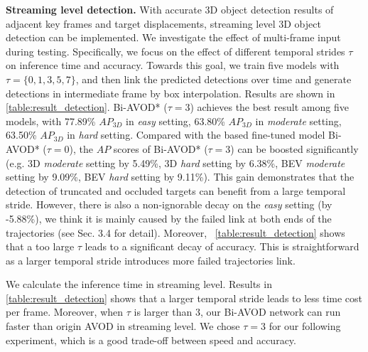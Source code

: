 \documentclass{bmvc2k}
\begin{document}
\textbf{Streaming level detection.} With accurate 3D object detection results of adjacent key frames and target displacements, streaming level 3D object detection can be implemented. We investigate the effect of multi-frame input during testing. Specifically, we focus on the effect of different temporal strides $\tau$  on inference time and accuracy. Towards this goal, we train five models with $\tau = \{0, 1, 3, 5, 7\}$, and then link the predicted detections over time and generate detections in intermediate frame by box interpolation. Results are shown in \tablename \, \ref{table:result_detection}. Bi-AVOD* ($\tau = 3$) achieves the best result among five models, with 77.89\% $AP_{3D}$ in \textit{easy} setting, 63.80\% $AP_{3D}$ in \textit{moderate} setting, 63.50\% $AP_{3D}$ in \textit{hard} setting. Compared with the based fine-tuned model Bi-AVOD* ($\tau = 0$), the $AP$ scores of Bi-AVOD* ($\tau = 3$) can be boosted significantly (e.g. 3D \textit{moderate} setting by 5.49\%, 3D \textit{hard} setting by 6.38\%, BEV \textit{moderate} setting by 9.09\%, BEV \textit{hard} setting by 9.11\%). This gain demonstrates that the detection of truncated and occluded targets can benefit from a large temporal stride. However, there is also a non-ignorable decay on the \textit{easy} setting (by -5.88\%), we think it is mainly caused by the failed link at both ends of the trajectories (see Sec. 3.4 for detail). Moreover,  \tablename \, \ref{table:result_detection} shows that a too large $\tau$ leads to a significant decay of accuracy. This is straightforward as a larger temporal stride introduces more failed trajectories link.

We calculate the inference time in streaming level. Results in  \tablename \, \ref{table:result_detection} shows that a larger temporal stride leads to less time cost per frame. Moreover, when $\tau$ is larger than 3, our Bi-AVOD network can run faster than origin AVOD in streaming level. We chose $\tau = 3$ for our following experiment, which is a good trade-off between speed and accuracy.
\end{document}
